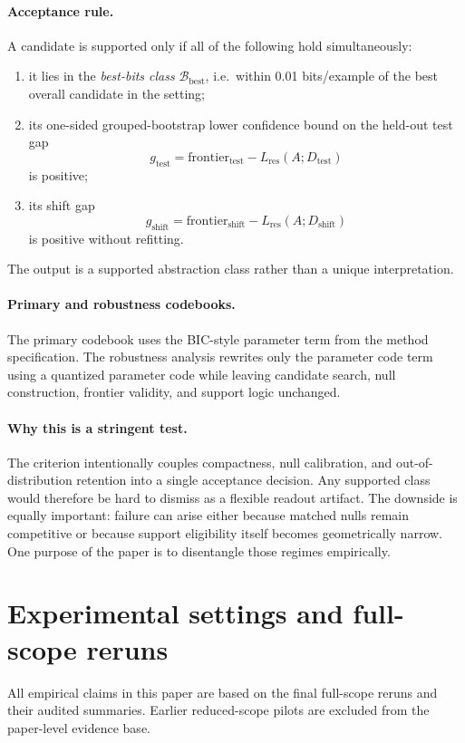 \documentclass[10pt]{article}
\newcommand{\Lres}{L_{\mathrm{res}}}
\newcommand{\gtest}{g_{\mathrm{test}}}
\newcommand{\gshift}{g_{\mathrm{shift}}}
\newcommand{\Bbest}{\mathcal{B}_{\mathrm{best}}}
\begin{document}
\paragraph{Acceptance rule.}
A candidate is supported only if all of the following hold simultaneously:
\begin{enumerate}[leftmargin=1.5em]
\item it lies in the \emph{best-bits class} $\Bbest$, i.e.\ within 0.01 bits/example of the best overall candidate in the setting;
\item its one-sided grouped-bootstrap lower confidence bound on the held-out test gap
\[
\gtest = \mathrm{frontier}_{\mathrm{test}}-\Lres(A;D_{\mathrm{test}})
\]
is positive;
\item its shift gap
\[
\gshift = \mathrm{frontier}_{\mathrm{shift}}-\Lres(A;D_{\mathrm{shift}})
\]
is positive without refitting.
\end{enumerate}
The output is a supported abstraction class rather than a unique interpretation.

\paragraph{Primary and robustness codebooks.}
The primary codebook uses the BIC-style parameter term from the method specification. The robustness analysis rewrites only the parameter code term using a quantized parameter code while leaving candidate search, null construction, frontier validity, and support logic unchanged.

\paragraph{Why this is a stringent test.}
The criterion intentionally couples compactness, null calibration, and out-of-distribution retention into a single acceptance decision. Any supported class would therefore be hard to dismiss as a flexible readout artifact. The downside is equally important: failure can arise either because matched nulls remain competitive or because support eligibility itself becomes geometrically narrow. One purpose of the paper is to disentangle those regimes empirically.

\section{Experimental settings and full-scope reruns}

All empirical claims in this paper are based on the final full-scope reruns and their audited summaries. Earlier reduced-scope pilots are excluded from the paper-level evidence base.
\end{document}
